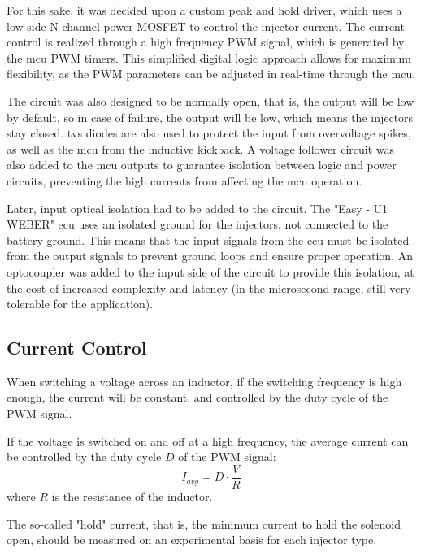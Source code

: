         For this sake, it was decided upon a custom peak and hold driver, which uses a low side N-channel power MOSFET to control the injector current. The current control is realized through a high frequency PWM signal, which is generated by the \gls{mcu} PWM timers. This simplified digital logic approach allows for maximum flexibility, as the PWM parameters can be adjusted in real-time through the \gls{mcu}.

        The circuit was also designed to be normally open, that is, the output will be low by default, so in case of failure, the output will be low, which means the injectors stay closed. \gls{tvs} diodes are also used to protect the input from overvoltage spikes, as well as the \gls{mcu} from the inductive kickback. A voltage follower circuit was also added to the \gls{mcu} outputs to guarantee isolation between logic and power circuits, preventing the high currents from affecting the \gls{mcu} operation.

        Later, input optical isolation had to be added to the circuit. The "Easy - U1 WEBER" \gls{ecu} uses an isolated ground for the injectors, not connected to the battery ground. This means that the input signals from the \gls{ecu} must be isolated from the output signals to prevent ground loops and ensure proper operation. An optocoupler was added to the input side of the circuit to provide this isolation, at the cost of increased complexity and latency (in the microsecond range, still very tolerable for the application).


        \subsection{Current Control}
           
            When switching a voltage across an inductor, if the switching frequency is high enough, the current will be constant, and controlled by the duty cycle of the PWM signal.

            If the voltage is switched on and off at a high frequency, the average current can be controlled by the duty cycle \(D\) of the PWM signal:
            \begin{equation}
                I_{avg} = D \cdot \frac{V}{R}
            \end{equation}
            where \(R\) is the resistance of the inductor.

            The so-called "hold" current, that is, the minimum current to hold the solenoid open, should be measured on an experimental basis for each injector type. 

